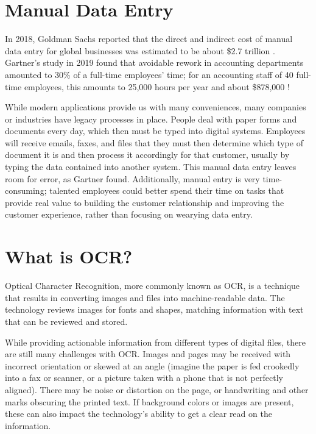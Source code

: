 \documentclass[conference]{IEEEtran}
\begin{document}
\section{Manual Data Entry} \label{sectionManualDataEntry}
In 2018, Goldman Sachs reported that the direct and indirect cost of manual data entry for global businesses was estimated to be about \$2.7 trillion \cite{schneider2018b2b}. Gartner's study in 2019 found that avoidable rework in accounting departments amounted to 30\% of a full-time employees' time; for an accounting staff of 40 full-time employees, this amounts to 25,000 hours per year and about \$878,000 \cite{lavelle2019gartner}!

While modern applications provide us with many conveniences, many companies or industries have legacy processes in place. People deal with paper forms and documents every day, which then must be typed into digital systems. Employees will receive emails, faxes, and files that they must then determine which type of document it is and then process it accordingly for that customer, usually by typing the data contained into another system. This manual data entry leaves room for error, as Gartner found. Additionally, manual entry is very time-consuming; talented employees could better spend their time on tasks that provide real value to building the customer relationship and improving the customer experience, rather than focusing on wearying data entry.

\section{What is OCR?} \label{sectionOcr}
Optical Character Recognition, more commonly known as OCR, is a technique that results in converting images and files into machine-readable data. The technology reviews images for fonts and shapes, matching information with text that can be reviewed and stored.

While providing actionable information from different types of digital files, there are still many challenges with OCR. Images and pages may be received with incorrect orientation or skewed at an angle (imagine the paper is fed crookedly into a fax or scanner, or a picture taken with a phone that is not perfectly aligned). There may be noise or distortion on the page, or handwriting and other marks obscuring the printed text. If background colors or images are present, these can also impact the technology's ability to get a clear read on the information.
\end{document}
